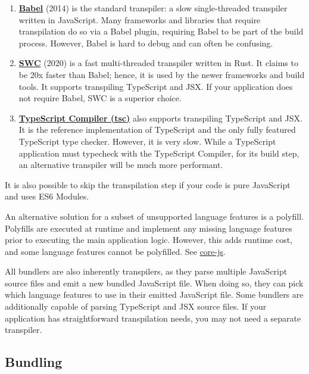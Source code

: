 \documentclass{article}
\newcommand{\tb}{\textbf}
\begin{document}
\begin{enumerate}
  \item \href{https://babeljs.io/}{\tb{Babel}} (2014) is the standard transpiler: a slow
    single-threaded transpiler written in JavaScript. Many frameworks and libraries that require
    transpilation do so via a Babel plugin, requiring Babel to be part of the build process.
    However, Babel is hard to debug and can often be confusing.

  \item \href{https://swc.rs/}{\tb{SWC}} (2020) is a fast multi-threaded transpiler written in Rust.
    It claims to be 20x faster than Babel; hence, it is used by the newer frameworks and build
    tools. It supports transpiling TypeScript and JSX. If your application does not require Babel,
    SWC is a superior choice.

  \item \href{https://github.com/microsoft/TypeScript}{\tb{TypeScript Compiler (tsc)}} also supports
    transpiling TypeScript and JSX. It is the reference implementation of TypeScript and the only
    fully featured TypeScript type checker. However, it is very slow. While a TypeScript application
    must typecheck with the TypeScript Compiler, for its build step, an alternative transpiler will
    be much more performant.
\end{enumerate}

It is also possible to skip the transpilation step if your code is pure JavaScript and uses ES6
Modules.

An alternative solution for a subset of unsupported language features is a polyfill. Polyfills are
executed at runtime and implement any missing language features prior to executing the main
application logic. However, this adds runtime cost, and some language features cannot be polyfilled.
See \href{https://github.com/zloirock/core-js}{core-js}.

All bundlers are also inherently transpilers, as they parse multiple JavaScript source files and
emit a new bundled JavaScript file. When doing so, they can pick which language features to use in
their emitted JavaScript file. Some bundlers are additionally capable of parsing TypeScript and JSX
source files. If your application has straightforward transpilation needs, you may not need a
separate transpiler.

\subsection{Bundling}
\end{document}
